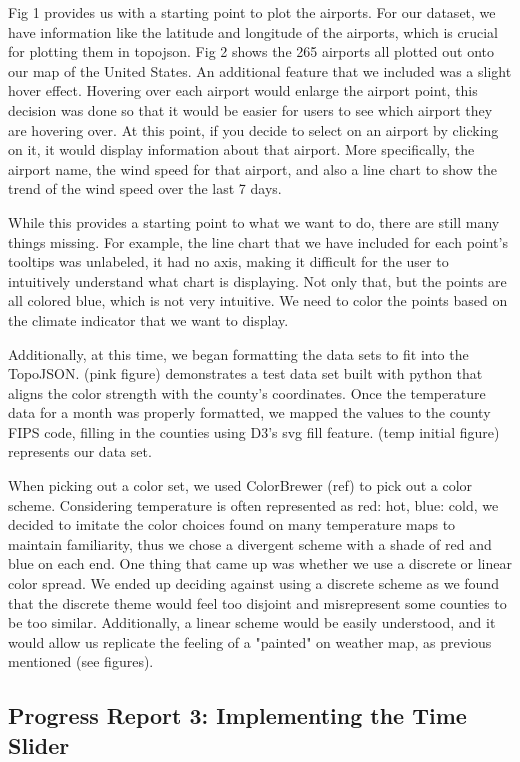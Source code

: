 \documentclass[9pt,twocolumn,twoside]{opticajnl}
\begin{document}
Fig 1 provides us with a starting point to plot the airports. For our dataset, we have information like the latitude and longitude of the airports, which is crucial for plotting them in topojson. Fig 2 shows the 265 airports all plotted out onto our map of the United States. An additional feature that we included was a slight hover effect. Hovering over each airport would enlarge the airport point, this decision was done so that it would be easier for users to see which airport they are hovering over. At this point, if you decide to select on an airport by clicking on it, it would display information about that airport. More specifically, the airport name, the wind speed for that airport, and also a line chart to show the trend of the wind speed over the last 7 days.

While this provides a starting point to what we want to do, there are still many things missing. For example, the line chart that we have included for each point's tooltips was unlabeled, it had no axis, making it difficult for the user to intuitively understand what chart is displaying. Not only that, but the points are all colored blue, which is not very intuitive. We need to color the points based on the climate indicator that we want to display.

Additionally, at this time, we began formatting the data sets to fit into the TopoJSON. (pink figure) demonstrates a test data set built with python that aligns the color strength with the county's coordinates. Once the temperature data for a month was properly formatted, we mapped the values to the county FIPS code, filling in the counties using D3's svg fill feature. (temp initial figure) represents our data set. 

When picking out a color set, we used ColorBrewer (ref) to pick out a color scheme. Considering temperature is often represented as red: hot, blue: cold, we decided to imitate the color choices found on many temperature maps to maintain familiarity, thus we chose a divergent scheme with a shade of red and blue on each end. One thing that came up was whether we use a discrete or linear color spread. We ended up deciding against using a discrete scheme as we found that the discrete theme would feel too disjoint and misrepresent some counties to be too similar. Additionally, a linear scheme would be easily understood, and it would allow us replicate the feeling of a "painted" on weather map, as previous mentioned (see figures).

\subsection {Progress Report 3: Implementing the Time Slider}
\end{document}
